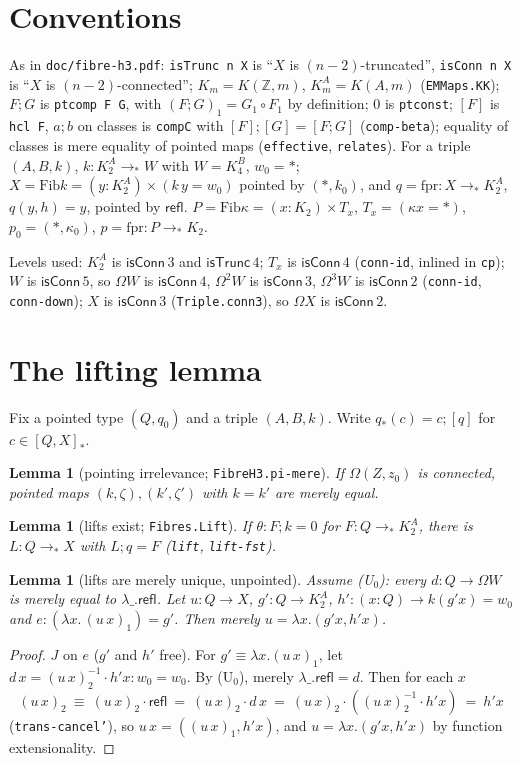 \documentclass[11pt]{amsart}
\newtheorem{lemma}[theorem]{Lemma}
\theoremstyle{definition}
\theoremstyle{remark}
\newcommand{\Om}{\Omega}
\newcommand{\Z}{\mathbb{Z}}
\newcommand{\code}[1]{\texttt{#1}}
\newcommand{\cT}{\mathsf{isTrunc}}
\newcommand{\cC}{\mathsf{isConn}}
\newcommand{\refl}{\mathsf{refl}}
\newcommand{\hc}[2]{[#1,#2]_*}
\newcommand{\Fib}{\mathrm{Fib}}
\newcommand{\cls}[1]{[#1]}
\begin{document}
\section{Conventions}

As in \code{doc/fibre-h3.pdf}: \code{isTrunc n X} is ``$X$ is
$(n-2)$-truncated'', \code{isConn n X} is ``$X$ is $(n-2)$-connected'';
$K_m=K(\Z,m)$, $K^A_m=K(A,m)$ (\code{EMMaps.KK}); $F;G$ is
\code{ptcomp F G}, with $(F;G)_1=G_1\circ F_1$ by definition; $0$ is
\code{ptconst}; $\cls F$ is \code{hcl F}, $a;b$ on classes is
\code{compC} with $\cls F;\cls G=\cls{F;G}$ (\code{comp-beta}); equality
of classes is mere equality of pointed maps (\code{effective},
\code{relates}). For a triple $(A,B,k)$, $k:K^A_2\to_*W$ with $W=K^B_4$,
$w_0=*$; $X=\Fib k=(y:K^A_2)\times(k\,y=w_0)$ pointed by $(*,k_0)$, and
$q=\mathrm{fpr}:X\to_*K^A_2$, $q(y,h)=y$, pointed by $\refl$.
$P=\Fib\kappa=(x:K_2)\times T_x$, $T_x=(\kappa x=*)$, $p_0=(*,\kappa_0)$,
$p=\mathrm{fpr}:P\to_*K_2$.

Levels used: $K^A_2$ is $\cC\,3$ and $\cT\,4$; $T_x$ is $\cC\,4$
(\code{conn-id}, inlined in \code{cp}); $W$ is $\cC\,5$, so $\Om W$ is $\cC\,4$, $\Om^2W$ is
$\cC\,3$, $\Om^3W$ is $\cC\,2$ (\code{conn-id}, \code{conn-down}); $X$ is
$\cC\,3$ (\code{Triple.conn3}), so $\Om X$ is $\cC\,2$.

\section{The lifting lemma}

Fix a pointed type $(Q,q_0)$ and a triple $(A,B,k)$. Write
$q_*(c)=c;\cls q$ for $c\in\hc QX$.

\begin{lemma}[pointing irrelevance; \code{FibreH3.pi-mere}]\label{l:pi}
If $\Om(Z,z_0)$ is connected, pointed maps $(k,\zeta),(k',\zeta')$ with
$k=k'$ are merely equal.
\end{lemma}

\begin{lemma}[lifts exist; \code{Fibres.Lift}]\label{l:ex}
If $\theta:F;k=0$ for $F:Q\to_*K^A_2$, there is $L:Q\to_*X$ with
$L;q=F$ (\code{lift}, \code{lift-fst}).
\end{lemma}

\begin{lemma}[lifts are merely unique, unpointed]\label{l:uniq0}
Assume (U$_0$): every $d:Q\to\Om W$ is merely equal to $\lambda\_.\refl$.
Let $u:Q\to X$, $g':Q\to K^A_2$, $h':(x:Q)\to k(g'x)=w_0$ and
$e:(\lambda x.\,(u\,x)_1)=g'$. Then merely $u=\lambda x.(g'x,h'x)$.
\end{lemma}
\begin{proof}
$J$ on $e$ ($g'$ and $h'$ free). For $g'\equiv\lambda x.(u\,x)_1$, let
$d\,x=(u\,x)_2^{-1}\cdot h'x:w_0=w_0$. By (U$_0$), merely
$\lambda\_.\refl=d$. Then for each $x$
\[(u\,x)_2\ \equiv\ (u\,x)_2\cdot\refl\ =\ (u\,x)_2\cdot d\,x\ =\ (u\,x)_2\cdot((u\,x)_2^{-1}\cdot h'x)\ =\ h'x\]
(\code{trans-cancel'}), so $u\,x=((u\,x)_1,h'x)$, and $u=\lambda
x.(g'x,h'x)$ by function extensionality.
\end{proof}
\end{document}

